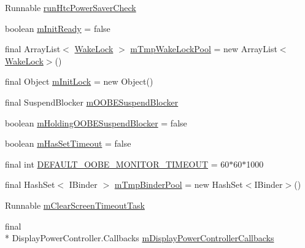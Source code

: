 \begin{DoxyCompactItemize}
\item 
Runnable \hyperlink{classcom_1_1android_1_1server_1_1power_1_1PowerManagerService_a700a9e221f3690cd1dc9943487da1e4a}{run\-Htc\-Power\-Saver\-Check}
\item 
boolean \hyperlink{classcom_1_1android_1_1server_1_1power_1_1PowerManagerService_a5193cd7636caa24ff263e73205b91693}{m\-Init\-Ready} = false
\item 
final Array\-List$<$ \hyperlink{classcom_1_1android_1_1server_1_1power_1_1PowerManagerService_1_1WakeLock}{Wake\-Lock} $>$ \hyperlink{classcom_1_1android_1_1server_1_1power_1_1PowerManagerService_a71833e81b6536b0b2a568a531efb4c36}{m\-Tmp\-Wake\-Lock\-Pool} = new Array\-List$<$\hyperlink{classcom_1_1android_1_1server_1_1power_1_1PowerManagerService_1_1WakeLock}{Wake\-Lock}$>$()
\item 
final Object \hyperlink{classcom_1_1android_1_1server_1_1power_1_1PowerManagerService_ac528c41646d105d5617e235710f7440d}{m\-Init\-Lock} = new Object()
\item 
final Suspend\-Blocker \hyperlink{classcom_1_1android_1_1server_1_1power_1_1PowerManagerService_a70d11c093fa4d97706f5c315211e454a}{m\-O\-O\-B\-E\-Suspend\-Blocker}
\item 
boolean \hyperlink{classcom_1_1android_1_1server_1_1power_1_1PowerManagerService_a41ef0c0ada410c48b6dacfb1ca297279}{m\-Holding\-O\-O\-B\-E\-Suspend\-Blocker} = false
\item 
boolean \hyperlink{classcom_1_1android_1_1server_1_1power_1_1PowerManagerService_a286ddd846a41cc40e9d5e2fb31d23e0a}{m\-Has\-Set\-Timeout} = false
\item 
final int \hyperlink{classcom_1_1android_1_1server_1_1power_1_1PowerManagerService_af4b996646aa4f3eca85df30b1995dfc3}{D\-E\-F\-A\-U\-L\-T\-\_\-\-O\-O\-B\-E\-\_\-\-M\-O\-N\-I\-T\-O\-R\-\_\-\-T\-I\-M\-E\-O\-U\-T} = 60$\ast$60$\ast$1000
\item 
final Hash\-Set$<$ I\-Binder $>$ \hyperlink{classcom_1_1android_1_1server_1_1power_1_1PowerManagerService_aebefef80ddc430120a16c492034d49d4}{m\-Tmp\-Binder\-Pool} = new Hash\-Set$<$I\-Binder$>$()
\item 
Runnable \hyperlink{classcom_1_1android_1_1server_1_1power_1_1PowerManagerService_ab91b78eabc803eafeec8cebc1dff7eea}{m\-Clear\-Screen\-Timeout\-Task}
\item 
final \\*
Display\-Power\-Controller.\-Callbacks \hyperlink{classcom_1_1android_1_1server_1_1power_1_1PowerManagerService_a35f81b5366140009f56192f251a6168b}{m\-Display\-Power\-Controller\-Callbacks}
\end{DoxyCompactItemize}
